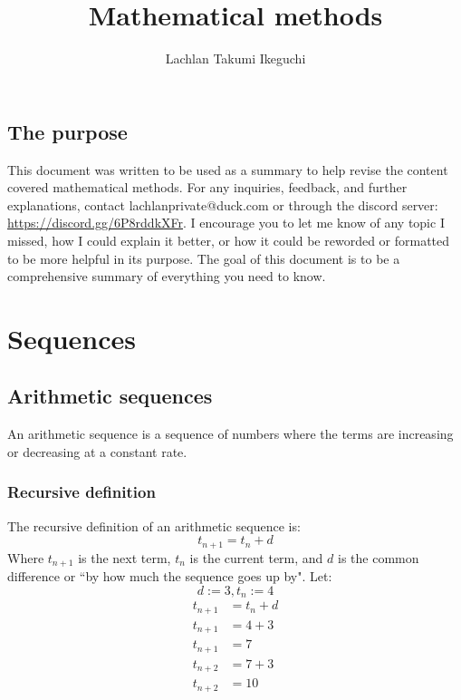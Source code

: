 \documentclass{book}
\title{Mathematical methods}
\author{Lachlan Takumi Ikeguchi}
\newenvironment{generalInformation}{}{}
\newenvironment{explanationOfTerms}{}{}
\newenvironment{example}{}{}
\begin{document}
\maketitle
\tableofcontents

\section{The purpose}
This document was written to be used as a summary to help revise the content covered mathematical methods.  For any inquiries, feedback, and further explanations, contact lachlanprivate@duck.com or through the discord server: \url{https://discord.gg/6P8rddkXFr}. I encourage you to let me know of any topic I missed, how I could explain it better, or how it could be reworded or formatted to be more helpful in its purpose.  The goal of this document is to be a comprehensive summary of everything you need to know.



\chapter{Sequences}
\section{Arithmetic sequences}
\begin{generalInformation}
	An arithmetic sequence is a sequence of numbers where the terms are increasing or decreasing at a constant rate.
\end{generalInformation}
\subsection{Recursive definition}
\begin{generalInformation}
	The recursive definition of an arithmetic sequence is:
\end{generalInformation}
\[
	t_{n + 1} = t_n + d
\]
\begin{explanationOfTerms}
	Where $t_{n + 1}$ is the next term, $t_n$ is the current term, and $d$ is the common difference or ``by how much the sequence goes up by".
\end{explanationOfTerms}
\begin{example}
	Let:
	\[
		d := 3, t_n := 4
	\]
	\begin{align*}
		t_{n + 1} & = t_n + d \\
		t_{n + 1} & = 4 + 3   \\
		t_{n + 1} & = 7       \\
		t_{n + 2} & = 7 + 3   \\
		t_{n + 2} & = 10      \\
	\end{align*}
\end{example}
\end{document}
